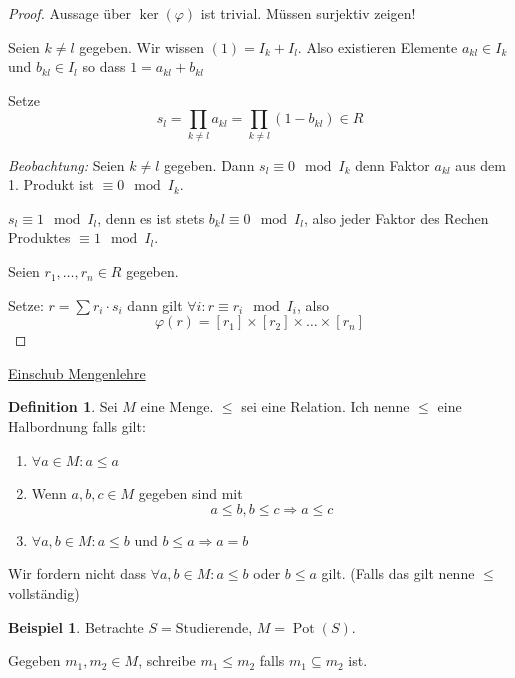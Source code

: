 \documentclass[12pt,parskip=full]{scrartcl}
\newcommand{\heading}{\underline}
\theoremstyle{definition}
\newtheorem{definition}[theorem]{Definition}
\newtheorem{example}[theorem]{Beispiel}
\theoremstyle{remark}
\begin{document}
	\begin{proof}
		Aussage über $\ker(\varphi)$ ist trivial. Müssen surjektiv zeigen!
		
		Seien $k \neq l$ gegeben. Wir wissen $(1) = I_k + I_l$. Also existieren Elemente $a_{kl} \in I_k$ und $b_{kl} \in I_l$ so dass $1 = a_{kl} + b_{kl}$
		
		Setze
		\begin{equation*}
			s_l = \prod_{k \neq l} a_{kl} = \prod_{k \neq l} (1 - b_{kl}) \in R
		\end{equation*}
		
		\textit{Beobachtung:} Seien $k \neq l$ gegeben. Dann $s_l \equiv 0 \mod I_k$ denn Faktor $a_{kl}$ aus dem 1. Produkt ist $\equiv 0 \mod I_k$.
		
		$s_l \equiv 1 \mod I_l$, denn es ist stets $b_kl \equiv 0 \mod I_l$, also jeder Faktor des Rechen Produktes $\equiv 1 \mod I_l$.
		
		Seien $r_1, \dots, r_n \in R$ gegeben.
		
		Setze: $r = \sum r_i \cdot s_i$ dann gilt $\forall i: r \equiv r_i \mod I_i$, also
		\begin{equation*}
			\varphi(r) = [r_1] \times [r_2] \times \dots \times [r_n]
		\end{equation*}
	\end{proof}

	\heading{Einschub Mengenlehre}
	
	\begin{definition}
		Sei $M$ eine Menge. $\leq$ sei eine Relation. Ich nenne $\leq$ eine Halbordnung falls gilt:
		\begin{enumerate}
			\item $\forall a \in M: a \leq a$
			\item Wenn $a,b,c \in M$ gegeben sind mit
			\begin{equation*}
				a \leq b, b \leq c \Rightarrow a \leq c
			\end{equation*}
			\item $\forall a,b \in M: a \leq b$ und $b \leq a \Rightarrow a = b$
		\end{enumerate}
		Wir fordern nicht dass $\forall a,b \in M: a \leq b$ oder $b \leq a$ gilt. (Falls das gilt nenne $\leq$ vollständig)
	\end{definition}

	\begin{example}
		Betrachte $S = \text{Studierende}$, $M = \operatorname{Pot}(S)$.
		
		Gegeben $m_1, m_2 \in M$, schreibe $m_1 \leq m_2$ falls $m_1 \subseteq m_2$ ist.
	\end{example}
\end{document}
